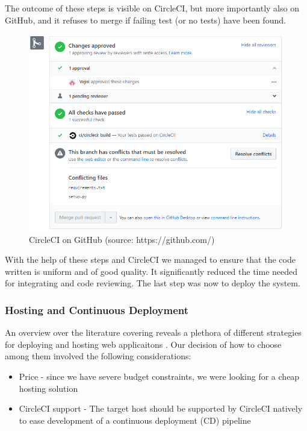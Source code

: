 The outcome of these steps is visible on CircleCI, but more importantly also on GitHub, and it refuses to merge if failing test (or no tests) have been found.

 \begin{figure}[H]
   \centering
   \includegraphics[scale=0.6]{06Coding/05Pictures/circleCI.png}
   \caption{CircleCI on GitHub (source: https://github.com/)}
   \label{CircleCI}
\end{figure}

With the help of these steps and CircleCI we managed to ensure that the code written is uniform and of good quality. It significantly reduced the time needed for integrating and code reviewing. The last step was now to deploy the system.

\subsubsection{Hosting and Continuous Deployment}
\label{Continuous Deployment}

An overview over the literature covering reveals a plethora of different strategies for deploying and hosting web applicaitons \cite{ConnollyFundamentals}. Our decision of how to choose among them involved the following considerations:

\begin{itemize}
    \item Price - since we have severe budget constraints, we were looking for a cheap hosting solution
    \item CircleCI support - The target host should be supported by CircleCI natively to ease development of a continuous deployment (CD) pipeline
\end{itemize}

